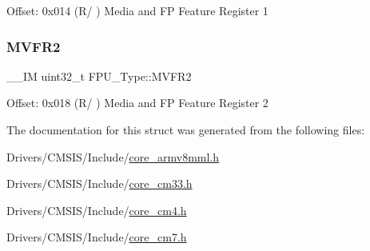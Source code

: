 Offset\+: 0x014 (R/ ) Media and FP Feature Register 1 \mbox{\label{struct_f_p_u___type_a479130e53a8b3c36fd8ee38b503a3911}} 
\subsubsection{\texorpdfstring{MVFR2}{MVFR2}}
{\footnotesize\ttfamily \+\_\+\+\_\+\+IM uint32\+\_\+t F\+P\+U\+\_\+\+Type\+::\+M\+V\+F\+R2}

Offset\+: 0x018 (R/ ) Media and FP Feature Register 2 

The documentation for this struct was generated from the following files\+:\begin{DoxyCompactItemize}
\item 
Drivers/\+C\+M\+S\+I\+S/\+Include/\mbox{\hyperlink{core__armv8mml_8h}{core\+\_\+armv8mml.\+h}}\item 
Drivers/\+C\+M\+S\+I\+S/\+Include/\mbox{\hyperlink{core__cm33_8h}{core\+\_\+cm33.\+h}}\item 
Drivers/\+C\+M\+S\+I\+S/\+Include/\mbox{\hyperlink{core__cm4_8h}{core\+\_\+cm4.\+h}}\item 
Drivers/\+C\+M\+S\+I\+S/\+Include/\mbox{\hyperlink{core__cm7_8h}{core\+\_\+cm7.\+h}}\end{DoxyCompactItemize}
